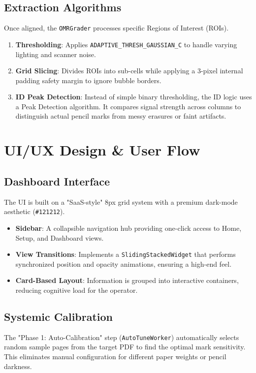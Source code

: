 \documentclass[a4paper,12pt]{article}
\begin{document}
\subsection{Extraction Algorithms}
Once aligned, the \texttt{OMRGrader} processes specific Regions of Interest (ROIs).
\begin{enumerate}
    \item \textbf{Thresholding}: Applies \texttt{ADAPTIVE\_THRESH\_GAUSSIAN\_C} to handle varying lighting and scanner noise.
    \item \textbf{Grid Slicing}: Divides ROIs into sub-cells while applying a 3-pixel internal padding safety margin to ignore bubble borders.
    \item \textbf{ID Peak Detection}: Instead of simple binary thresholding, the ID logic uses a Peak Detection algorithm. It compares signal strength across columns to distinguish actual pencil marks from messy erasures or faint artifacts.
\end{enumerate}

\section{UI/UX Design \& User Flow}
\subsection{Dashboard Interface}
The UI is built on a "SaaS-style" 8px grid system with a premium dark-mode aesthetic (\texttt{\#121212}).
\begin{itemize}
    \item \textbf{Sidebar}: A collapsible navigation hub providing one-click access to Home, Setup, and Dashboard views.
    \item \textbf{View Transitions}: Implements a \texttt{SlidingStackedWidget} that performs synchronized position and opacity animations, ensuring a high-end feel.
    \item \textbf{Card-Based Layout}: Information is grouped into interactive containers, reducing cognitive load for the operator.
\end{itemize}

\subsection{Systemic Calibration}
The "Phase 1: Auto-Calibration" step (\texttt{AutoTuneWorker}) automatically selects random sample pages from the target PDF to find the optimal mark sensitivity. This eliminates manual configuration for different paper weights or pencil darkness.
\end{document}
